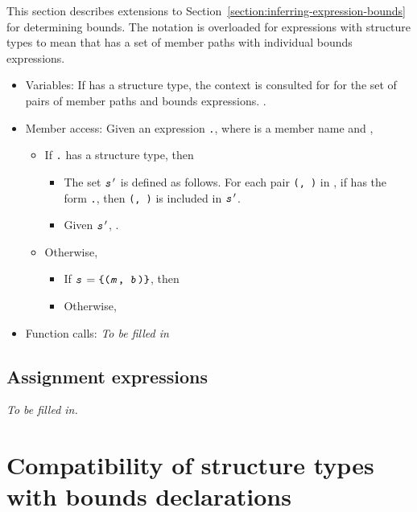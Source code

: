 This section describes extensions to Section~\ref{section:inferring-expression-bounds} for
determining bounds.   The notation  is overloaded for expressions
with structure types to mean that  has a set of member paths with individual bounds expressions.
\begin{itemize}
\item Variables: If  has a structure type, the context is consulted for  for
the set  of pairs of member paths and bounds expressions.  .
\item Member access: Given an expression \texttt{.}, where  is 
a member name and ,
\begin{itemize}
\item If \texttt{.} has a structure type, then
\begin{itemize}
\item The set $\texttt{\textit{s}}^{\prime}$ is defined as follows.  For each pair 
      \texttt{(, )} in , if  has the form 
      \texttt{.}, then \texttt{(, )} is
      included in $\texttt{\textit{s}}^\prime$.
\item  Given $\texttt{\textit{s}}^\prime$, .
\end{itemize}
\item Otherwise,
\begin{itemize}
\item If $\texttt{\textit{s}} = \texttt{\{(\texttt{\textit{m}}, \texttt{\textit{b}})\}}$, then 
\item Otherwise, 
\end{itemize}
\end{itemize}
\item Function calls: {\em To be filled in}
\end{itemize}

\subsection{Assignment expressions}

{\em To be filled in.}

\section{Compatibility of structure types with bounds declarations}

